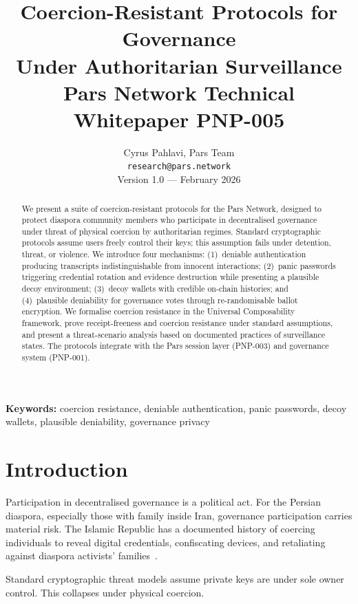 \documentclass[11pt,a4paper]{article}
\title{%
    \textbf{Coercion-Resistant Protocols for Governance\\
    Under Authoritarian Surveillance}\\[0.5em]
    \large Pars Network Technical Whitepaper PNP-005
}
\author{%
    Cyrus Pahlavi, Pars Team\\
    \texttt{research@pars.network}\\[0.5em]
    \small Version 1.0 --- February 2026
}
\date{}
\begin{document}
\parscoverpage

\thispagestyle{fancy}

\begin{abstract}
\noindent
We present a suite of coercion-resistant protocols for the Pars Network,
designed to protect diaspora community members who participate in
decentralised governance under threat of physical coercion by authoritarian
regimes.  Standard cryptographic protocols assume users freely control their
keys; this assumption fails under detention, threat, or violence.  We
introduce four mechanisms: (1)~deniable authentication producing transcripts
indistinguishable from innocent interactions; (2)~panic passwords triggering
credential rotation and evidence destruction while presenting a plausible
decoy environment; (3)~decoy wallets with credible on-chain histories; and
(4)~plausible deniability for governance votes through re-randomisable
ballot encryption.  We formalise coercion resistance in the Universal
Composability framework, prove receipt-freeness and coercion resistance
under standard assumptions, and present a threat-scenario analysis based
on documented practices of surveillance states.  The protocols integrate
with the Pars session layer (PNP-003) and governance system (PNP-001).
\end{abstract}

\vspace{1em}
\noindent\textbf{Keywords:} coercion resistance, deniable authentication,
panic passwords, decoy wallets, plausible deniability, governance privacy

\tableofcontents
\newpage

\section{Introduction}
\label{sec:introduction}

Participation in decentralised governance is a political act.  For the
Persian diaspora, especially those with family inside Iran, governance
participation carries material risk.  The Islamic Republic has a documented
history of coercing individuals to reveal digital credentials, confiscating
devices, and retaliating against diaspora
activists' families~\cite{freedomhouse2023iran}.

Standard cryptographic threat models assume private keys are under sole
owner control.  This collapses under physical coercion.
\end{document}
